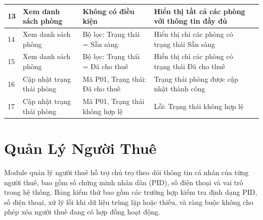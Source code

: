 \documentclass[12pt,a4paper]{article}
\begin{document}
\begin{table}[h!]
\begin{small}
\begin{tabularx}{\textwidth}{|p{0.8cm}|p{2.5cm}|p{3cm}|p{3cm}|p{2.5cm}|}
    13 & Xem danh sách phòng & Không có điều kiện & Hiển thị tất cả các phòng với thông tin đầy đủ & \\ \hline

    14 & Xem danh sách phòng & Bộ lọc: Trạng thái = Sẵn sàng & Hiển thị chỉ các phòng có trạng thái Sẵn sàng & \\ \hline

    15 & Xem danh sách phòng & Bộ lọc: Trạng thái = Đã cho thuê & Hiển thị chỉ các phòng có trạng thái Đã cho thuê & \\ \hline

    16 & Cập nhật trạng thái phòng & Mã P01, Trạng thái: Đã cho thuê & Trạng thái phòng được cập nhật thành công & \\ \hline

    17 & Cập nhật trạng thái phòng & Mã P01, Trạng thái không hợp lệ & Lỗi: Trạng thái không hợp lệ & \\ \hline

    \end{tabularx}
    \end{small}
\end{table}

\newpage

\section{Quản Lý Người Thuê}

Module quản lý người thuê hỗ trợ chủ trọ theo dõi thông tin cá nhân của từng người thuê, bao gồm số chứng minh nhân dân (PID), số điện thoại và vai trò trong hệ thống. Bảng kiểm thử bao gồm các trường hợp kiểm tra định dạng PID, số điện thoại, xử lý lỗi khi dữ liệu trùng lặp hoặc thiếu, và ràng buộc không cho phép xóa người thuê đang có hợp đồng hoạt động.
\end{document}
